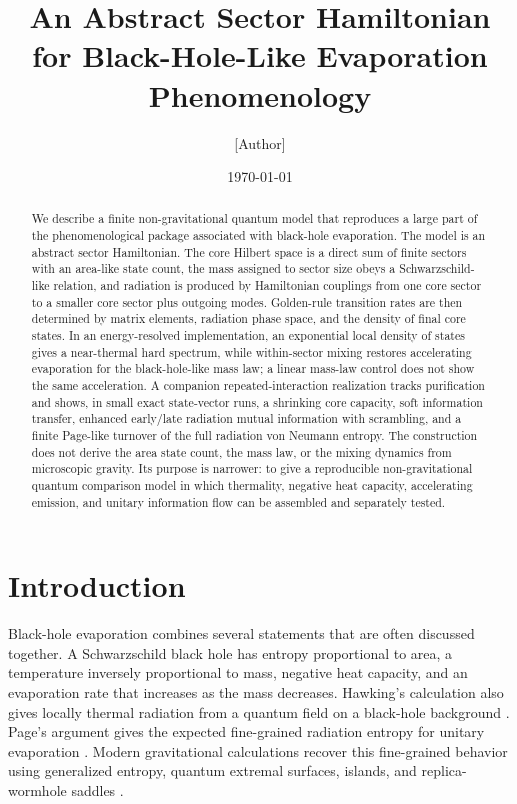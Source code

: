 \documentclass[aps,prd,onecolumn,longbibliography,nofootinbib]{revtex4-2}
\begin{document}
\title{An Abstract Sector Hamiltonian for Black-Hole-Like Evaporation Phenomenology}

\author{[Author]}
\affiliation{[Affiliation]}
\date{\today}

\begin{abstract}
We describe a finite non-gravitational quantum model that reproduces a large
part of the phenomenological package associated with black-hole evaporation.
The model is an abstract sector Hamiltonian.  The core Hilbert space is a
direct sum of finite sectors with an area-like state count, the mass assigned
to sector size obeys a Schwarzschild-like relation, and radiation is produced
by Hamiltonian couplings from one core sector to a smaller core sector plus
outgoing modes.  Golden-rule transition rates are then determined by matrix
elements, radiation phase space, and the density of final core states.  In an
energy-resolved implementation, an exponential local density of states gives a
near-thermal hard spectrum, while within-sector mixing restores accelerating
evaporation for the black-hole-like mass law; a linear mass-law control does
not show the same acceleration.  A companion repeated-interaction realization
tracks purification and shows, in small exact state-vector runs, a shrinking
core capacity, soft information transfer, enhanced early/late radiation mutual
information with scrambling, and a finite Page-like turnover of the full
radiation von Neumann entropy.  The construction does not derive the area
state count, the mass law, or the mixing dynamics from microscopic gravity.
Its purpose is narrower: to give a reproducible non-gravitational quantum
comparison model in which thermality, negative heat capacity, accelerating
emission, and unitary information flow can be assembled and separately tested.
\end{abstract}

\maketitle

\section{Introduction}

Black-hole evaporation combines several statements that are often discussed
together.  A Schwarzschild black hole has entropy proportional to area, a
temperature inversely proportional to mass, negative heat capacity, and an
evaporation rate that increases as the mass decreases.  Hawking's calculation
also gives locally thermal radiation from a quantum field on a black-hole
background \cite{Hawking1975}.  Page's argument gives the expected
fine-grained radiation entropy for unitary evaporation
\cite{Page1993Info,Page1993Average}.  Modern gravitational calculations
recover this fine-grained behavior using generalized entropy, quantum extremal
surfaces, islands, and replica-wormhole saddles
\cite{Penington2020,AEMM2019,AlmheiriReview2021}.
\end{document}
